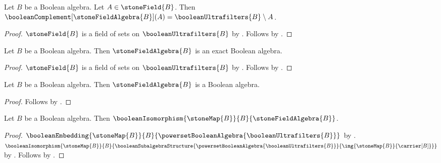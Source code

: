 \begin{proposition}\label{stone_field_algebra_complement_apply}
    Let $B$ be a Boolean algebra.
    Let $A\in\stoneField{B}$.
    Then $\booleanComplement[\stoneFieldAlgebra{B}](A)=
        \booleanUltrafilters{B}\setminus A$.
\end{proposition}
\begin{proof}
    $\stoneField{B}$ is a field of sets on
        $\booleanUltrafilters{B}$ by
        .
    Follows by
        .
\end{proof}

\begin{theorem}\label{stone_field_algebra_is_exact_boolean_algebra}
    Let $B$ be a Boolean algebra.
    Then $\stoneFieldAlgebra{B}$ is an exact Boolean algebra.
\end{theorem}
\begin{proof}
    $\stoneField{B}$ is a field of sets on
        $\booleanUltrafilters{B}$ by
        .
    Follows by
        .
\end{proof}

\begin{classification}\label{stone_field_algebra_is_boolean_algebra}
    Let $B$ be a Boolean algebra.
    Then $\stoneFieldAlgebra{B}$ is a Boolean algebra.
\end{classification}
\begin{proof}
    Follows by
        .
\end{proof}

\begin{theorem}\label{stone_representation}
    Let $B$ be a Boolean algebra.
    Then $\booleanIsomorphism
        {\stoneMap{B}}{B}{\stoneFieldAlgebra{B}}$.
\end{theorem}
\begin{proof}
    $\booleanEmbedding
        {\stoneMap{B}}
        {B}
        {\powersetBooleanAlgebra{\booleanUltrafilters{B}}}$ by
        .
    $\booleanIsomorphism
        {\stoneMap{B}}
        {B}
        {\booleanSubalgebraStructure
            {\powersetBooleanAlgebra{\booleanUltrafilters{B}}}
            {\img{\stoneMap{B}}{\carrier[B]}}}$ by
        .
    Follows by
        .
\end{proof}
